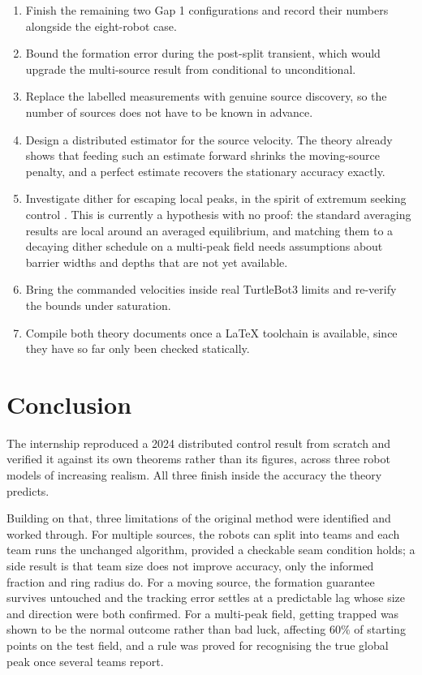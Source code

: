 \documentclass[11pt,a4paper]{article}
\begin{document}
\begin{enumerate}
    \item Finish the remaining two Gap 1 configurations and record their numbers alongside the
    eight-robot case.
    \item Bound the formation error during the post-split transient, which would upgrade the
    multi-source result from conditional to unconditional.
    \item Replace the labelled measurements with genuine source discovery, so the number of sources
    does not have to be known in advance.
    \item Design a distributed estimator for the source velocity. The theory already shows that
    feeding such an estimate forward shrinks the moving-source penalty, and a perfect estimate
    recovers the stationary accuracy exactly.
    \item Investigate dither for escaping local peaks, in the spirit of extremum seeking control
    \cite{krsticwang2000,khong2014}. This is currently a hypothesis with no proof: the standard
    averaging results are local around an averaged equilibrium, and matching them to a decaying
    dither schedule on a multi-peak field needs assumptions about barrier widths and depths that are
    not yet available.
    \item Bring the commanded velocities inside real TurtleBot3 limits and re-verify the bounds under
    saturation.
    \item Compile both theory documents once a LaTeX toolchain is available, since they have so far
    only been checked statically.
\end{enumerate}

\section{Conclusion}

The internship reproduced a 2024 distributed control result from scratch and verified it against its
own theorems rather than its figures, across three robot models of increasing realism. All three
finish inside the accuracy the theory predicts.

Building on that, three limitations of the original method were identified and worked through. For
multiple sources, the robots can split into teams and each team runs the unchanged algorithm,
provided a checkable seam condition holds; a side result is that team size does not improve accuracy,
only the informed fraction and ring radius do. For a moving source, the formation guarantee survives
untouched and the tracking error settles at a predictable lag whose size and direction were both
confirmed. For a multi-peak field, getting trapped was shown to be the normal outcome rather than
bad luck, affecting $60\%$ of starting points on the test field, and a rule was proved for
recognising the true global peak once several teams report.
\end{document}
